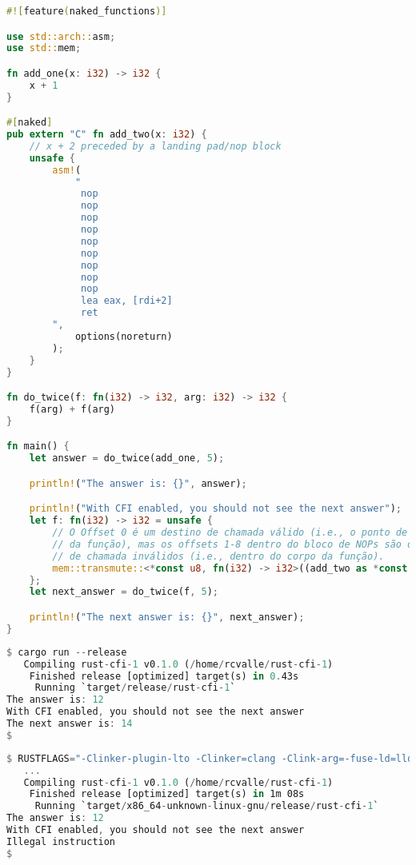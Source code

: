 \documentclass{article}
\begin{document}
\begin{lstlisting}[language=Rust, caption={Redirecionando o fluxo de controle usando uma chamada indireta para um destino inválido (i.e., dentro do corpo da função).}]
#![feature(naked_functions)]

use std::arch::asm;
use std::mem;

fn add_one(x: i32) -> i32 {
    x + 1
}

#[naked]
pub extern "C" fn add_two(x: i32) {
    // x + 2 preceded by a landing pad/nop block
    unsafe {
        asm!(
            "
             nop
             nop
             nop
             nop
             nop
             nop
             nop
             nop
             nop
             lea eax, [rdi+2]
             ret
        ",
            options(noreturn)
        );
    }
}

fn do_twice(f: fn(i32) -> i32, arg: i32) -> i32 {
    f(arg) + f(arg)
}

fn main() {
    let answer = do_twice(add_one, 5);

    println!("The answer is: {}", answer);

    println!("With CFI enabled, you should not see the next answer");
    let f: fn(i32) -> i32 = unsafe {
        // O Offset 0 é um destino de chamada válido (i.e., o ponto de entrada
        // da função), mas os offsets 1-8 dentro do bloco de NOPs são destinos
        // de chamada inválidos (i.e., dentro do corpo da função).
        mem::transmute::<*const u8, fn(i32) -> i32>((add_two as *const u8).offset(5))
    };
    let next_answer = do_twice(f, 5);

    println!("The next answer is: {}", next_answer);
}
\end{lstlisting}

\begin{lstlisting}[language=Rust, caption={Compilação e execução da Fig. 8 com LLVM CFI desabilitado.}]
$ cargo run --release
   Compiling rust-cfi-1 v0.1.0 (/home/rcvalle/rust-cfi-1)
    Finished release [optimized] target(s) in 0.43s
     Running `target/release/rust-cfi-1`
The answer is: 12
With CFI enabled, you should not see the next answer
The next answer is: 14
$
\end{lstlisting}

\begin{lstlisting}[language=Rust, caption={Compilação e execução da Fig. 8 com LLVM CFI habilitado.}]
$ RUSTFLAGS="-Clinker-plugin-lto -Clinker=clang -Clink-arg=-fuse-ld=lld -Zsanitizer=cfi" cargo run -Zbuild-std -Zbuild-std-features --release --target x86_64-unknown-linux-gnu
   ...
   Compiling rust-cfi-1 v0.1.0 (/home/rcvalle/rust-cfi-1)
    Finished release [optimized] target(s) in 1m 08s
     Running `target/x86_64-unknown-linux-gnu/release/rust-cfi-1`
The answer is: 12
With CFI enabled, you should not see the next answer
Illegal instruction
$
\end{lstlisting}
\end{document}
